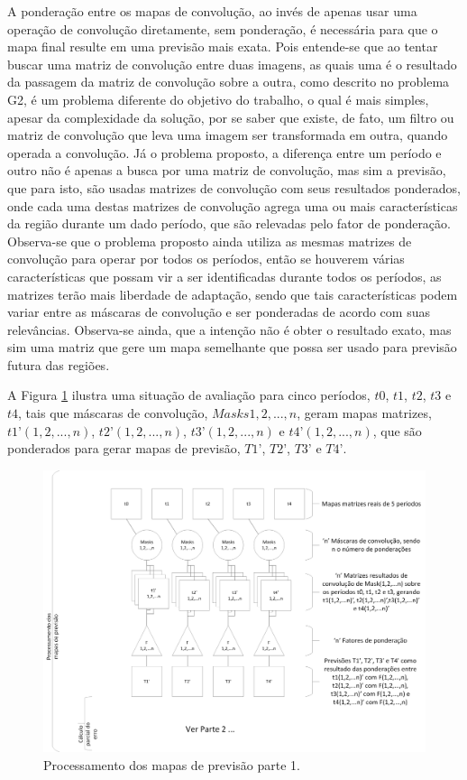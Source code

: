 A ponderação entre os mapas de convolução, ao invés de apenas usar uma operação de convolução diretamente, sem ponderação, é necessária para que o mapa final resulte em uma previsão mais exata. Pois entende-se que ao tentar buscar uma matriz de convolução entre duas imagens, as quais uma é o resultado da passagem da matriz de convolução sobre a outra, como descrito no problema G2, é um problema diferente do objetivo do trabalho, o qual é mais simples, apesar da complexidade da solução, por se saber que existe, de fato, um filtro ou matriz de convolução que leva uma imagem ser transformada em outra, quando operada a convolução. Já o problema proposto, a diferença entre um período e outro não é apenas a busca por uma matriz de convolução, mas sim a previsão, que para isto, são usadas matrizes de convolução com seus resultados ponderados, onde cada uma destas matrizes de convolução agrega uma ou mais características da região durante um dado período, que são relevadas pelo fator de ponderação. Observa-se que o problema proposto ainda utiliza as mesmas matrizes de convolução para operar por todos os períodos, então se houverem várias características que possam vir a ser identificadas durante todos os períodos, as matrizes terão mais liberdade de adaptação, sendo que tais características podem variar entre as máscaras de convolução e ser ponderadas de acordo com suas relevâncias. Observa-se ainda, que a intenção não é obter o resultado exato, mas sim uma matriz que gere um mapa semelhante que possa ser usado para previsão futura das regiões.

A Figura \ref{fig:ForecastEvalPart0}  ilustra uma situação de avaliação para cinco períodos, \(t0\), \(t1\), \(t2\), \(t3\) e \(t4\), tais que máscaras de convolução, \(Masks 1,2,...,n\), geram mapas matrizes, \(t1’(1,2,...,n)\), \(t2’(1,2,...,n)\), \(t3’(1,2,...,n)\) e \(t4’(1,2,...,n)\), que são ponderados para gerar mapas de previsão, \(T1’\), \(T2’\), \(T3’\) e \(T4’\).

\begin{figure}[h]
	\centering	\includegraphics[scale=0.55]{Figuras/Ilustrations-ForecastEvalPart0.png}
	\caption{Processamento dos mapas de previsão parte 1.}
	\label{fig:ForecastEvalPart0}
\end{figure}

